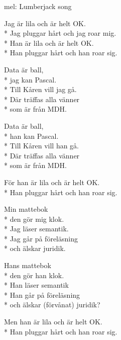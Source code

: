 \begin{SongText}
    \begin{SongInfo}
        mel: Lumberjack song
    \end{SongInfo}
\begin{SongVerse}
Jag är lila och är helt OK.\\*%
Jag pluggar hårt och jag roar mig.\\*%
Han är lila och är helt OK.\\*%
Han pluggar hårt och han roar sig.
\end{SongVerse}
\begin{SongVerse}
Data är ball,\\*%
jag kan Pascal.\\*%
Till Kåren vill jag gå.\\*%
Där träffas alla vänner\\*%
som är från MDH.
\end{SongVerse}
\begin{SongVerse}
Data är ball,\\*%
han kan Pascal.\\*%
Till Kåren vill han gå.\\*%
Där träffas alla vänner\\*%
som är från MDH.
\end{SongVerse}
\begin{SongVerse}
För han är lila och är helt OK.\\*%
Han pluggar hårt och han roar sig.
\end{SongVerse}
\begin{SongVerse}
Min mattebok\\*%
den gör mig klok.\\*%
Jag läser semantik.\\*%
Jag går på föreläsning\\*%
och älskar juridik.
\end{SongVerse}
\begin{SongVerse}
Hans mattebok\\*%
den gör han klok.\\*%
Han läser semantik\\*%
Han går på föreläsning\\*%
och älskar (förvånat) juridik?
\end{SongVerse}
\begin{SongVerse}
Men han är lila och är helt OK.\\*%
Han pluggar hårt och han roar sig.
\end{SongVerse}
\begin{SongVerse}

\end{SongVerse}
\end{SongText}
